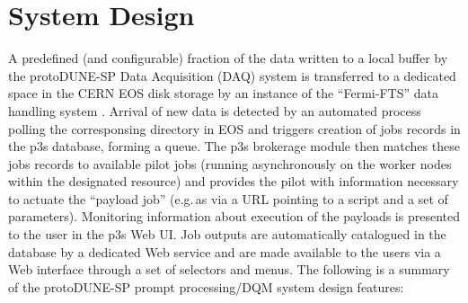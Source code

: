 \documentclass{webofc}
\newcommand{\pd}{protoDUNE\xspace}
\begin{document}
\section{System Design}
\label{sec:outline}

A predefined (and configurable) fraction of the data written to a local buffer
by the  \pd-SP Data Acquisition (DAQ) system is  transferred to a dedicated space
in the  CERN EOS disk storage  \cite{castoreos,eos_role} by an instance of the ``Fermi-FTS''
data handling system \cite{fts}. Arrival of new data is detected by an automated process
polling the corresponsing directory in EOS and triggers creation of jobs records in the
p3s database, forming a queue. The p3s brokerage module then matches these jobs records
to available pilot jobs (running asynchronously on the worker nodes within the designated
resource) and provides the pilot with information necessary to actuate the ``payload job'' (e.g.\,as via a URL
pointing to a script and a set of parameters). Monitoring information about execution
of the payloads is presented to the user in the p3s Web UI.
Job outputs are automatically catalogued in the database by a dedicated Web service
and are made available to the users via a Web interface through a set of selectors and menus.
The following is a summary  of the \pd-SP prompt processing/DQM system design features\cite{chep18}:
\end{document}
